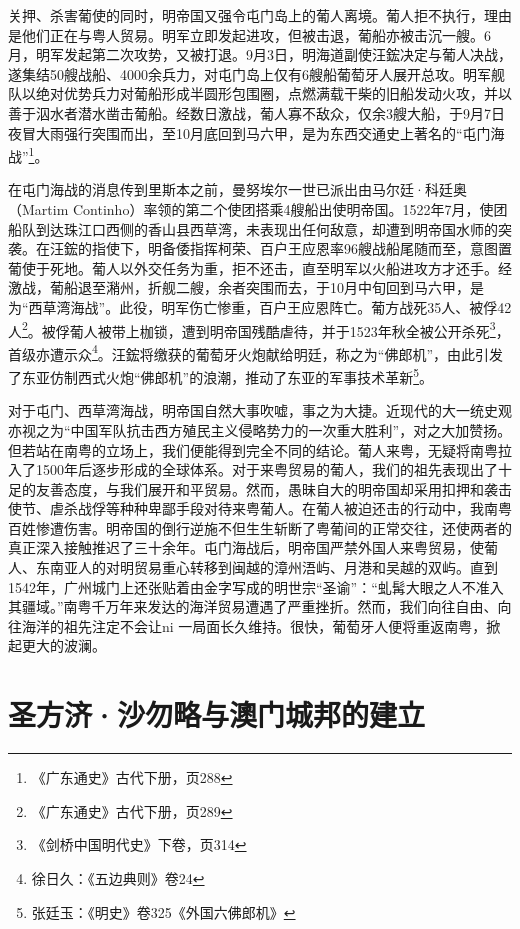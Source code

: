 关押、杀害葡使的同时，明帝国又强令屯门岛上的葡人离境。葡人拒不执行，理由是他们正在与粤人贸易。明军立即发起进攻，但被击退，葡船亦被击沉一艘。6月，明军发起第二次攻势，又被打退。9月3日，明海道副使汪鋐决定与葡人决战，遂集结50艘战船、4000余兵力，对屯门岛上仅有6艘船葡萄牙人展开总攻。明军舰队以绝对优势兵力对葡船形成半圆形包围圈，点燃满载干柴的旧船发动火攻，并以善于泅水者潜水凿击葡船。经数日激战，葡人寡不敌众，仅余3艘大船，于9月7日夜冒大雨强行突围而出，至10月底回到马六甲，是为东西交通史上著名的“屯门海战”\footnote{《广东通史》古代下册，页288}。

在屯门海战的消息传到里斯本之前，曼努埃尔一世已派出由马尔廷·科廷奥（Martim Continho）率领的第二个使团搭乘4艘船出使明帝国。1522年7月，使团船队到达珠江口西侧的香山县西草湾，未表现出任何敌意，却遭到明帝国水师的突袭。在汪鋐的指使下，明备倭指挥柯荣、百户王应恩率96艘战船尾随而至，意图置葡使于死地。葡人以外交任务为重，拒不还击，直至明军以火船进攻方才还手。经激战，葡船退至潲州，折舰二艘，余者突围而去，于10月中旬回到马六甲，是为“西草湾海战”。此役，明军伤亡惨重，百户王应恩阵亡。葡方战死35人、被俘42人\footnote{《广东通史》古代下册，页289}。被俘葡人被带上枷锁，遭到明帝国残酷虐待，并于1523年秋全被公开杀死\footnote{《剑桥中国明代史》下卷，页314}，首级亦遭示众\footnote{徐日久：《五边典则》卷24}。汪鋐将缴获的葡萄牙火炮献给明廷，称之为“佛郎机”，由此引发了东亚仿制西式火炮“佛郎机”的浪潮，推动了东亚的军事技术革新\footnote{张廷玉：《明史》卷325《外国六佛郎机》}。

对于屯门、西草湾海战，明帝国自然大事吹嘘，事之为大捷。近现代的大一统史观亦视之为“中国军队抗击西方殖民主义侵略势力的一次重大胜利”，对之大加赞扬。但若站在南粤的立场上，我们便能得到完全不同的结论。葡人来粤，无疑将南粤拉入了1500年后逐步形成的全球体系。对于来粤贸易的葡人，我们的祖先表现出了十足的友善态度，与我们展开和平贸易。然而，愚昧自大的明帝国却采用扣押和袭击使节、虐杀战俘等种种卑鄙手段对待来粤葡人。在葡人被迫还击的行动中，我南粤百姓惨遭伤害。明帝国的倒行逆施不但生生斩断了粤葡间的正常交往，还使两者的真正深入接触推迟了三十余年。屯门海战后，明帝国严禁外国人来粤贸易，使葡人、东南亚人的对明贸易重心转移到闽越的漳州浯屿、月港和吴越的双屿。直到1542年，广州城门上还张贴着由金字写成的明世宗“圣谕”：“虬髯大眼之人不准入其疆域。”南粤千万年来发达的海洋贸易遭遇了严重挫折。然而，我们向往自由、向往海洋的祖先注定不会让ni 一局面长久维持。很快，葡萄牙人便将重返南粤，掀起更大的波澜。

\section{圣方济·沙勿略与澳门城邦的建立}

